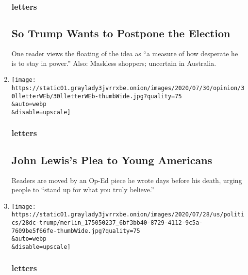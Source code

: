 \begin{enumerate}
  \hypertarget{letters-2}{%
  \subsubsection{letters}\label{letters-2}}

  \hypertarget{so-trump-wants-to-postpone-the-election}{%
  \subsection{So Trump Wants to Postpone the
  Election}\label{so-trump-wants-to-postpone-the-election}}

  One reader views the floating of the idea as ``a measure of how
  desperate he is to stay in power.'' Also: Maskless shoppers; uncertain
  in Australia.
\item
  \href{/2020/07/30/opinion/letters/john-lewis-civil-rights.html}{}

  \texttt{[image: https://static01.graylady3jvrrxbe.onion/images/2020/07/30/opinion/30lletterWEb/30lletterWEb-thumbWide.jpg?quality=75\\\&auto=webp\\\&disable=upscale]}

  \hypertarget{letters-3}{%
  \subsubsection{letters}\label{letters-3}}

  \hypertarget{john-lewiss-plea-to-young-americans}{%
  \subsection{John Lewis's Plea to Young
  Americans}\label{john-lewiss-plea-to-young-americans}}

  Readers are moved by an Op-Ed piece he wrote days before his death,
  urging people to ``stand up for what you truly believe.''
\item
  \href{/2020/07/30/opinion/letters/trump-personality.html}{}

  \texttt{[image: https://static01.graylady3jvrrxbe.onion/images/2020/07/28/us/politics/28dc-trump/merlin\_175050237\_6bf3bb40-8729-4112-9c5a-7609be5f66fe-thumbWide.jpg?quality=75\\\&auto=webp\\\&disable=upscale]}

  \hypertarget{letters-4}{%
  \subsubsection{letters}\label{letters-4}}

  \hypertarget{why-nobody-likes-trump}{%
}
\end{enumerate}
